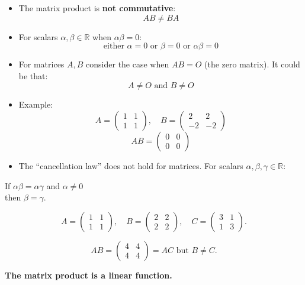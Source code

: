 \begin{itemize}
    \item The matrix product is \textbf{not commutative}:
    \[ AB \neq BA \]

    \item For scalars $\alpha, \beta \in \mathbb{R}$ when $\alpha\beta = 0$:
    \[ \text{either } \alpha = 0 \text{ or } \beta = 0 \text{ or } \alpha\beta = 0 \]

    \item For matrices $A, B$ consider the case when $AB = O$ (the zero matrix). It could be that:
    \[ A \neq O \text{ and } B \neq O \]

    \item Example:
    \[ A = \begin{pmatrix} 1 & 1 \\ 1 & 1 \end{pmatrix}, \quad B = \begin{pmatrix} 2 & 2 \\ -2 & -2 \end{pmatrix} \]
    \[ AB = \begin{pmatrix} 0 & 0 \\ 0 & 0 \end{pmatrix} \]

    \item The ``cancellation law'' does not hold for matrices. For scalars $\alpha, \beta, \gamma \in \mathbb{R}$:
\end{itemize}



If $\alpha \beta = \alpha \gamma$ and $\alpha \neq 0$ \\
then $\beta = \gamma$.

\[
A = \begin{pmatrix}
1 & 1 \\
1 & 1
\end{pmatrix}, \quad
B = \begin{pmatrix}
2 & 2 \\
2 & 2
\end{pmatrix}, \quad
C = \begin{pmatrix}
3 & 1 \\
1 & 3
\end{pmatrix}.
\]

\[
AB = \begin{pmatrix}
4 & 4 \\
4 & 4
\end{pmatrix} = AC \text{ but } B \neq C.
\]

\textbf{The matrix product is a linear function.}

